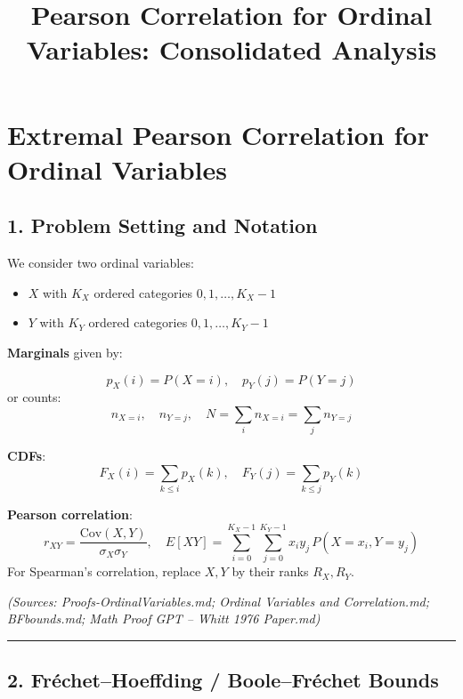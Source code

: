 \documentclass[
  letterpaper,
  DIV=11,
  numbers=noendperiod]{scrartcl}
\title{Pearson Correlation for Ordinal Variables: Consolidated Analysis}
\author{}
\date{}
\providecommand{\tightlist}{%
  \setlength{\itemsep}{0pt}\setlength{\parskip}{0pt}}
\renewcommand*\contentsname{Table of contents}
\newcommand\contentsname{Table of contents}
\theoremstyle{remark}
\begin{document}
\maketitle

\renewcommand*\contentsname{Table of contents}
{
\hypersetup{linkcolor=}
\setcounter{tocdepth}{3}
\tableofcontents
}

\section{Extremal Pearson Correlation for Ordinal
Variables}\label{extremal-pearson-correlation-for-ordinal-variables}

\subsection{1. Problem Setting and
Notation}\label{problem-setting-and-notation}

We consider two ordinal variables:

\begin{itemize}
\tightlist
\item
  \(X\) with \(K_X\) ordered categories \(0, 1, \dots, K_X-1\)
\item
  \(Y\) with \(K_Y\) ordered categories \(0, 1, \dots, K_Y-1\)
\end{itemize}

\textbf{Marginals} given by:

\[
p_X(i) = P(X = i), \quad p_Y(j) = P(Y = j)
\] or counts: \[
n_{X=i}, \quad n_{Y=j}, \quad N = \sum_i n_{X=i} = \sum_j n_{Y=j}
\]

\textbf{CDFs}: \[
F_X(i) = \sum_{k \le i} p_X(k), \quad F_Y(j) = \sum_{k \le j} p_Y(k)
\]

\textbf{Pearson correlation}: \[
r_{XY} = \frac{\mathrm{Cov}(X,Y)}{\sigma_X \sigma_Y}, \quad
E[XY] = \sum_{i=0}^{K_X-1} \sum_{j=0}^{K_Y-1} x_i y_j \, P(X=x_i, Y=y_j)
\] For Spearman's correlation, replace \(X,Y\) by their ranks
\(R_X,R_Y\).

\emph{(Sources: Proofs-OrdinalVariables.md; Ordinal Variables and
Correlation.md; BFbounds.md; Math Proof GPT -- Whitt 1976 Paper.md)}

\begin{center}\rule{0.5\linewidth}{0.5pt}\end{center}

\subsection{2. Fréchet--Hoeffding / Boole--Fréchet
Bounds}\label{fruxe9chethoeffding-boolefruxe9chet-bounds}
\end{document}
